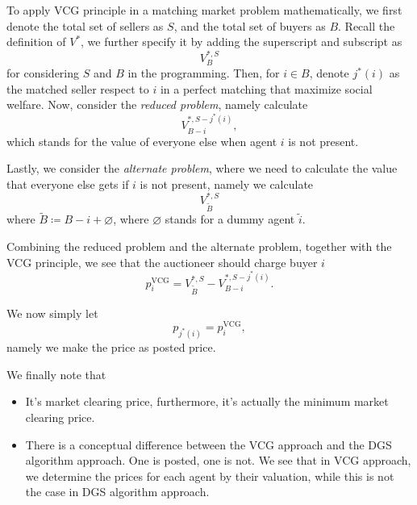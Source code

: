 To apply VCG principle in a matching market problem mathematically, we first denote the total set of sellers as \(S\), and the total set of buyers as \(B\). Recall
the definition of \(V^{*}\), we further specify it by adding the superscript and subscript as
\[
	V^{*, S}_{B}
\]
for considering \(S\) and \(B\) in the programming. Then, for \(i\in B\), denote \(j^{*} (i)\) as the matched seller respect to \(i\) in a perfect matching that
maximize social welfare. Now, consider the \emph{reduced problem}, namely calculate
\[
	V^{*, S-j^{*}(i)}_{B-i},
\]
which stands for the value of everyone else when agent \(i\) is not present.

Lastly, we consider the \emph{alternate problem}, where we need to calculate the value that everyone else gets if \(i\) is not present, namely we
calculate
\[
	V^{*, S}_{\widetilde{B}}
\]
where \(\widetilde{B} \coloneqq B - i + \varnothing \), where \(\varnothing \) stands for a dummy agent \(\widetilde{i} \).

Combining the reduced problem and the alternate problem, together with the VCG principle, we see that the auctioneer should charge buyer \(i\)
\[
	p_{i}^\mathrm{VCG} = V_{\widetilde{B} }^{*, S} - V_{B-i}^{*, S-j^{*} (i)}.
\]

We now simply let
\[
	p_{j^{*} (i)} = p_{i}^\mathrm{VCG},
\]
namely we make the price as posted price.

\begin{remark}
	We finally note that
	\begin{itemize}
		\item It's market clearing price, furthermore, it's actually the minimum market clearing price.
		\item There is a conceptual difference between the VCG approach and the DGS algorithm approach. One is posted, one is not. We see that in VCG approach, we determine
		      the prices for each agent by their valuation, while this is not the case in DGS algorithm approach.
	\end{itemize}
\end{remark}
